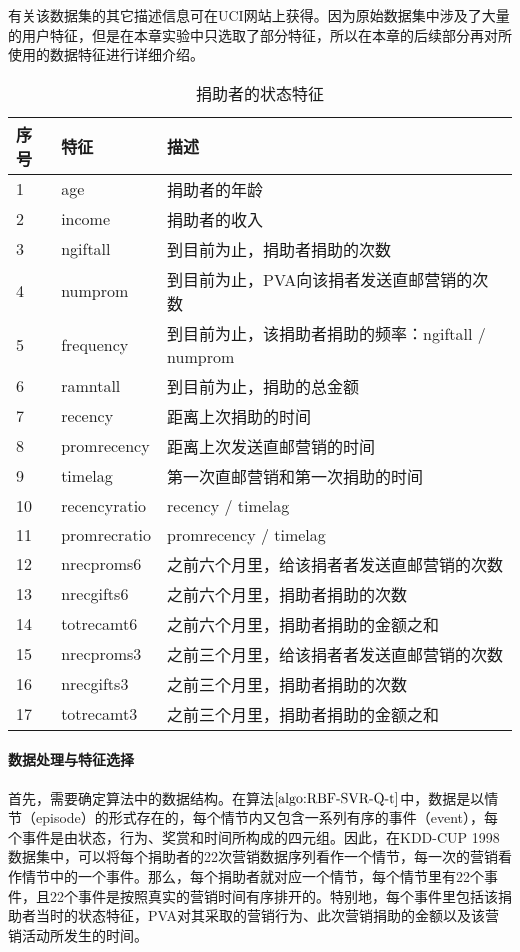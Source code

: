 有关该数据集的其它描述信息可在UCI网站上获得。因为原始数据集中涉及了大量的用户特征，但是在本章实验中只选取了部分特征，所以在本章的后续部分再对所使用的数据特征进行详细介绍。

\begin{table}[htbp]
  \centering
  \caption{捐助者的状态特征}
  \label{tab:obser_donors}
  \begin{tabular}{lll}
    \toprule
      序号 & 特征 & 描述 \\
    \midrule
      1 & age & 捐助者的年龄 \\
      2 &income & 捐助者的收入 \\
      3 &ngiftall & 到目前为止，捐助者捐助的次数 \\
      4 &numprom & 到目前为止，PVA向该捐者发送直邮营销的次数 \\
      5 &frequency & 到目前为止，该捐助者捐助的频率：ngiftall / numprom \\
      6 &ramntall & 到目前为止，捐助的总金额 \\
      7 &recency & 距离上次捐助的时间 \\
      8 &promrecency & 距离上次发送直邮营销的时间\\
      9 &timelag & 第一次直邮营销和第一次捐助的时间\\
      10 &recencyratio & recency / timelag\\
	  11 &promrecratio & promrecency / timelag\\
      12 &nrecproms6 & 之前六个月里，给该捐者者发送直邮营销的次数\\
      13 &nrecgifts6 & 之前六个月里，捐助者捐助的次数\\
      14 &totrecamt6 & 之前六个月里，捐助者捐助的金额之和\\ 
      15 &nrecproms3 & 之前三个月里，给该捐者者发送直邮营销的次数\\
      16 &nrecgifts3 & 之前三个月里，捐助者捐助的次数\\
      17 &totrecamt3 & 之前三个月里，捐助者捐助的金额之和\\            	  
    \bottomrule
  \end{tabular}
\end{table}

\paragraph{数据处理与特征选择}
首先，需要确定算法中的数据结构。在算法$\ref{algo:RBF-SVR-Q-t}$中，数据是以情节（episode）的形式存在的，每个情节内又包含一系列有序的事件（event），每个事件是由状态，行为、奖赏和时间所构成的四元组。因此，在KDD-CUP 1998数据集中，可以将每个捐助者的22次营销数据序列看作一个情节，每一次的营销看作情节中的一个事件。那么，每个捐助者就对应一个情节，每个情节里有22个事件，且22个事件是按照真实的营销时间有序排开的。特别地，每个事件里包括该捐助者当时的状态特征，PVA对其采取的营销行为、此次营销捐助的金额以及该营销活动所发生的时间。

